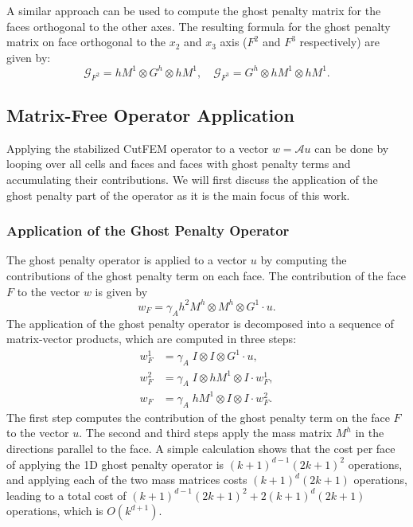 \documentclass[11pt,a4paper]{article}
\begin{document}
A similar approach can be used to compute the ghost penalty matrix for the faces orthogonal to the other axes. The
resulting formula for the ghost penalty matrix on face orthogonal to the $x_2$ and $x_3$ axis ($F^2$ and $F^3$
respectively) are given by:
\[
    \mathcal{G}_{F^2} = h M^1  \otimes G^h \otimes h M^1, \quad \mathcal{G}_{F^3} = G^h  \otimes  h M^1 \otimes h M^1 .
\]


\subsection{Matrix-Free Operator Application}

Applying the stabilized CutFEM operator to a vector $ w= \mathcal{A}u$ can be done by looping over all cells and faces
and faces with ghost penalty terms and accumulating their contributions. We will first discuss the application of the
ghost penalty part of the operator as it is the main focus of this work.

\subsubsection{Application of the Ghost Penalty Operator}

The ghost penalty operator is applied to a vector $u$ by computing the contributions of the ghost penalty term on each
face. The contribution of the face $F$ to the vector $w$ is given by
\begin{equation}
    w_F =  \gamma_A  h^{2} M^h \otimes M^h \otimes G^1	\cdot u.
\end{equation}
The application of the ghost penalty operator is decomposed into a sequence of matrix-vector products, which are
computed in three steps:
\begin{align}
    w_F^1 & =  \gamma_A \;  I \otimes I \otimes G^1 \cdot u  ,       \\
    w_F^2 & =  \gamma_A \;  I \otimes h M^1 \otimes I \cdot w_F^{1}, \\
    w_F   & =  \gamma_A \; h M^1 \otimes I \otimes I \cdot w_F^{2}.
\end{align}
The first step computes the contribution of the ghost penalty term on the face $F$ to the vector $u$. The
second
and third steps apply the mass matrix $M^h$ in the directions parallel to the face.
A simple calculation shows that the cost per face of applying the 1D ghost penalty
operator is $(k+1)^{d-1}(2k+1)^2$ operations, and applying each of the two mass matrices costs $(k+1)^d(2k+1)$
operations, leading to a total cost of $(k+1)^{d-1}(2k+1)^2 + 2(k+1)^d(2k+1)$ operations, which is $O(k^{d+1})$.
\end{document}
